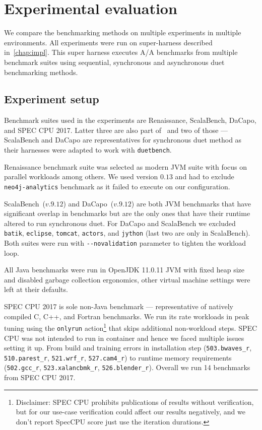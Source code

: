 \chapter{Experimental evaluation}
\label{chap:evaluation}

We compare the benchmarking methods on multiple experiments in multiple environments.
All experiments were run on super-harness described in~\cref{chap:impl}.
This super harness executes A/A benchmarks from multiple benchmark suites using sequential, synchronous and asynchronous duet benchmarking methods.

\section{Experiment setup}
\label{sec:experiment_setup}

Benchmark suites used in the experiments are Renaissance, ScalaBench, DaCapo, and SPEC CPU 2017.
Latter three are also part of~\citet{bulej2020duet} and two of those --- ScalaBench and DaCapo are representatives for synchronous duet method as their harnesses were adapted to work with \lstinline{duetbench}.

Renaissance benchmark suite was selected as modern JVM suite with focus on parallel workloads among others\cite{prokopec2019renaissance}.
We used version $0.13$ and had to exclude \lstinline{neo4j-analytics} benchmark as it failed to execute on our configuration.

ScalaBench~($v.9.12$) and DaCapo~($v.9.12$) are both JVM benchmarks that have significant overlap in benchmarks but are the only ones that have their runtime altered to run synchronous duet.
For DaCapo and ScalaBench we excluded \lstinline{batik}, \lstinline{eclipse}, \lstinline{tomcat}, \lstinline{actors}, and \lstinline{jython} (last two are only in ScalaBench).
Both suites were run with \lstinline{--novalidation} parameter to tighten the workload loop.

All Java benchmarks were run in OpenJDK 11.0.11 JVM with fixed heap size and disabled garbage collection ergonomics, other virtual machine settings were left at their defaults.

SPEC CPU 2017 is sole non-Java benchmark --- representative of natively compiled C, C++, and Fortran benchmarks.
We run its rate workloads in peak tuning using the \lstinline{onlyrun} action\footnote{Disclaimer: SPEC CPU prohibits publications of results without verification, but for our use-case verification could affect our results negatively, and we don't report SpecCPU score just use the iteration durations.} that skips additional non-workload steps.
SPEC CPU was not intended to run in container and hence we faced multiple issues setting it up.
From build and training errors in installation step (\lstinline{503.bwaves_r}, \lstinline{510.parest_r}, \lstinline{521.wrf_r}, \lstinline{527.cam4_r}) to runtime memory requirements (\lstinline{502.gcc_r}, \lstinline{523.xalancbmk_r}, \lstinline{526.blender_r}).
Overall we run 14 benchmarks from SPEC CPU 2017.

